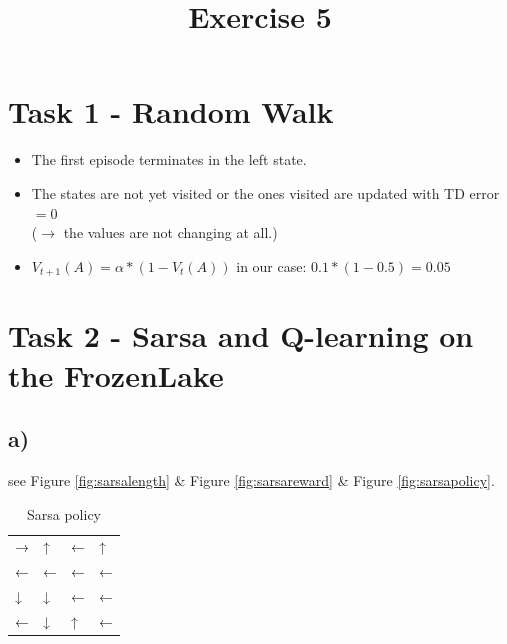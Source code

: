 \documentclass[a4paper]{article}
\date{}
\author{}
\title{\textbf{Exercise 5}}
\begin{document}
\maketitle 
\thispagestyle{fancy}

\section*{Task 1 - Random Walk}
\begin{itemize}
	\item The first episode terminates in the left state.
	\item The states are not yet visited or the ones visited are updated with TD error $ = 0 $\\
	($ \rightarrow $ the values are not changing at all.)
	\item $ V_{t+1}(A) = \alpha * (1 - V_t(A)) $ in our case: $ 0.1 * (1 - 0.5) = 0.05 $
\end{itemize}


\section*{Task 2 - Sarsa and Q-learning on the FrozenLake}

\subsection*{a)}
see Figure \ref{fig:sarsalength} \& Figure \ref{fig:sarsareward} \& Figure \ref{fig:sarsapolicy}.

\begin{table}[!ht]
	\centering
	\begin{tabular}{llll}
		→ & ↑ & ← & ↑ \\
		← & ← & ← & ← \\
		↓ & ↓ & ← & ← \\
		← & ↓ & ↑ & ←
	\end{tabular}
	\caption{Sarsa policy}
\end{table}
\end{document}
